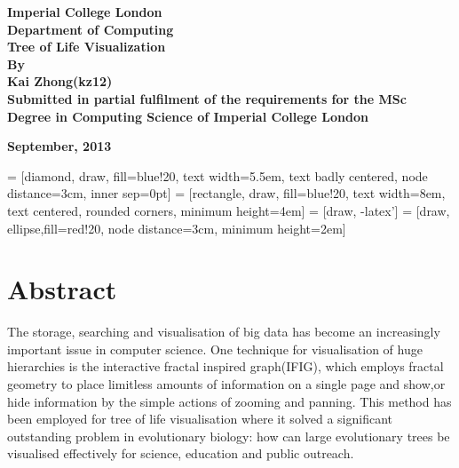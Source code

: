 \documentclass[a4paper,11pt,twoside]{report}
\begin{document}
\begin{titlepage}
\begin{center}


\textbf{\large Imperial College London}\\[0.5cm]

\textbf{\large Department of Computing}\\[10cm]


\textbf{\large Tree of Life Visualization}\\[0.5cm]
\textbf{\large By }\\[0.5cm]
\textbf{\large Kai Zhong(kz12) } \\[10cm]

\textbf{Submitted in partial fulfilment of the requirements for the MSc Degree in Computing Science of Imperial College London}
\vfill

\textbf{\large September, 2013}

\end{center}
\end{titlepage}

 = [diamond, draw, fill=blue!20, 
    text width=5.5em, text badly centered, node distance=3cm, inner sep=0pt]
 = [rectangle, draw, fill=blue!20, 
    text width=8em, text centered, rounded corners, minimum height=4em]
 = [draw, -latex']
 = [draw, ellipse,fill=red!20, node distance=3cm,
    minimum height=2em]
    
\chapter*{Abstract}

The storage, searching and visualisation of big data has become an increasingly important issue in computer science. One technique for visualisation of huge hierarchies is the interactive fractal inspired graph(IFIG), which employs fractal geometry to place limitless amounts of information on a single page and show,or  hide information by the simple actions of zooming and panning. This method has been employed for tree of life visualisation where it solved a significant outstanding problem in evolutionary biology: how can large evolutionary trees be visualised effectively for science, education and public outreach.
\end{document}
